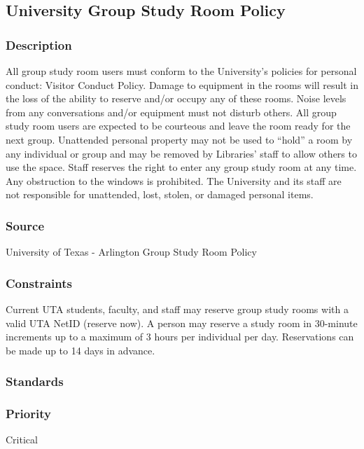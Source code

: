 \subsection{University Group Study Room Policy}
\subsubsection{Description}
All group study room users must conform to the University’s policies for personal conduct: Visitor Conduct Policy. Damage to equipment in the rooms will result in the loss of the ability to reserve and/or occupy any of these rooms. Noise levels from any conversations and/or equipment must not disturb others. All group study room users are expected to be courteous and leave the room ready for the next group. Unattended personal property may not be used to “hold” a room by any individual or group and may be removed by Libraries’ staff to allow others to use the space. Staff reserves the right to enter any group study room at any time. Any obstruction to the windows is prohibited. The University and its staff are not responsible for unattended, lost, stolen, or damaged personal items.
\subsubsection{Source}
University of Texas - Arlington Group Study Room Policy
\subsubsection{Constraints}
Current UTA students, faculty, and staff may reserve group study rooms with a valid UTA NetID (reserve now). A person may reserve a study room in 30-minute increments up to a maximum of 3 hours per individual per day. Reservations can be made up to 14 days in advance.
\subsubsection{Standards}

\subsubsection{Priority}
Critical
